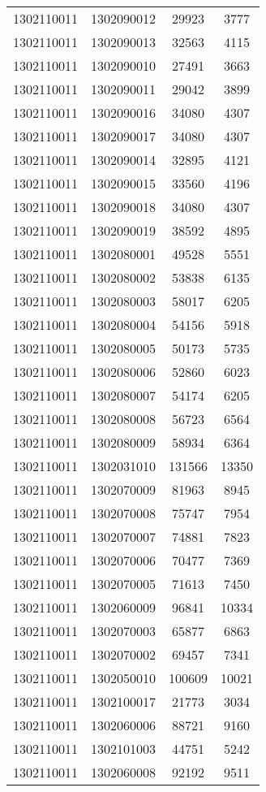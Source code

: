 \begin{longtable}{llcc}
1302110011 & 1302090012 & 29923 & 3777\\
1302110011 & 1302090013 & 32563 & 4115\\
1302110011 & 1302090010 & 27491 & 3663\\
1302110011 & 1302090011 & 29042 & 3899\\
1302110011 & 1302090016 & 34080 & 4307\\
1302110011 & 1302090017 & 34080 & 4307\\
1302110011 & 1302090014 & 32895 & 4121\\
1302110011 & 1302090015 & 33560 & 4196\\
1302110011 & 1302090018 & 34080 & 4307\\
1302110011 & 1302090019 & 38592 & 4895\\
1302110011 & 1302080001 & 49528 & 5551\\
1302110011 & 1302080002 & 53838 & 6135\\
1302110011 & 1302080003 & 58017 & 6205\\
1302110011 & 1302080004 & 54156 & 5918\\
1302110011 & 1302080005 & 50173 & 5735\\
1302110011 & 1302080006 & 52860 & 6023\\
1302110011 & 1302080007 & 54174 & 6205\\
1302110011 & 1302080008 & 56723 & 6564\\
1302110011 & 1302080009 & 58934 & 6364\\
1302110011 & 1302031010 & 131566 & 13350\\
1302110011 & 1302070009 & 81963 & 8945\\
1302110011 & 1302070008 & 75747 & 7954\\
1302110011 & 1302070007 & 74881 & 7823\\
1302110011 & 1302070006 & 70477 & 7369\\
1302110011 & 1302070005 & 71613 & 7450\\
1302110011 & 1302060009 & 96841 & 10334\\
1302110011 & 1302070003 & 65877 & 6863\\
1302110011 & 1302070002 & 69457 & 7341\\
1302110011 & 1302050010 & 100609 & 10021\\
1302110011 & 1302100017 & 21773 & 3034\\
1302110011 & 1302060006 & 88721 & 9160\\
1302110011 & 1302101003 & 44751 & 5242\\
1302110011 & 1302060008 & 92192 & 9511\\

\end{longtable}
